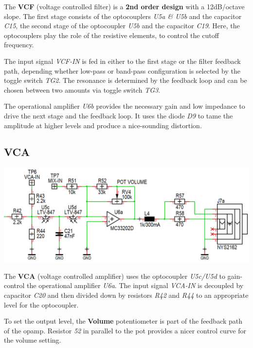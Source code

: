 \documentclass{scrartcl}
\begin{document}
The \textbf{VCF} (voltage controlled filter) is a \textbf{2nd order design} with a 12dB/octave slope. The first stage consists of the optocouplers \emph{U5a \& U5b} and the capacitor \emph{C15}, the second stage of the optocoupler \emph{U5b} and the capacitor \emph{C19}. Here, the optocouplers play the role of the resistive elements, to control the cutoff frequency.

The input signal \emph{VCF-IN} is fed in either to the first stage or the filter feedback path, depending whether low-pass or band-pass configuration is selected by the toggle switch \emph{TG2}. The resonance is determined by the feedback loop and can be chosen between two amounts via toggle switch \emph{TG3}.

The operational amplifier \emph{U6b} provides the necessary gain and low impedance to drive the next stage and the feedback loop. It uses the diode \emph{D9} to tame the amplitude at higher levels and produce a nice-sounding distortion.

\pagebreak
\subsection{VCA}
\vspace{0.25cm}
\begin{center}
    \includegraphics[scale=0.40]{assets/schema-vca.png}
\end{center}

The \textbf{VCA} (voltage controlled amplifier) uses the optocoupler \emph{U5c/U5d} to gain-control the operational amplifier \emph{U6a}. The input signal \emph{VCA-IN} is decoupled by capacitor \emph{C20} and then divided down by resistors \emph{R42} and \emph{R44} to an appropriate level for the optocoupler.

To set the output level, the \textbf{Volume} potentiometer is part of the feedback path of the opamp. Resistor \emph{52} in parallel to the pot provides a nicer control curve for the volume setting.
\end{document}
